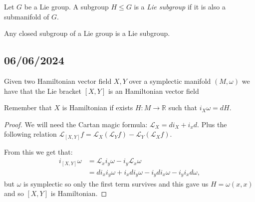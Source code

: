 \documentclass[misc]{subfiles}
\begin{document}
\begin{Dfn}\label{Dfn: Lie subgroup}
    Let $G$ be a Lie group. A subgroup $H\le G$ is a \emph{Lie subgroup} if it is also a submanifold of $G$.
\end{Dfn}

\begin{Nt}
    Any closed subgroup of a Lie group is a Lie subgroup.
\end{Nt}

\subsection*{06/06/2024}

\begin{Prp}
    Given two Hamiltonian vector field $X,Y$ over a symplectic manifold $(M,\omega)$ we have that the Lie bracket $[X,Y]$ is an Hamiltonian vector field

    \begin{Rmk}
        Remember that $X$ is Hamiltonian if exists $H: M \rightarrow \mathbb{R}$ such that $i_X\omega=dH$.
    \end{Rmk}

    \begin{proof}
        We will need the Cartan magic formula: $\mathcal{L}_X=di_X+i_xd$. Plus the following relation $\mathcal{L}_{[X,Y]}f=\mathcal{L}_X(\mathcal{L}_Yf)-\mathcal{L}_Y(\mathcal{L}_Xf)$.

        From this we get that:
        \begin{align*}
            i_{[X,Y]}\omega &= \mathcal{L}_xi_y\omega-i_y\mathcal{L}_x\omega \\
                            &= di_xi_y\omega+i_xdi_y\omega-i_ydi_x\omega-i_yi_xd\omega,
        \end{align*}
        but $\omega$ is symplectic so only the first term survives and this gave us $H=\omega(x,x)$ and so $[X,Y]$ is Hamiltonian.

    \end{proof}

\end{Prp}
\end{document}
